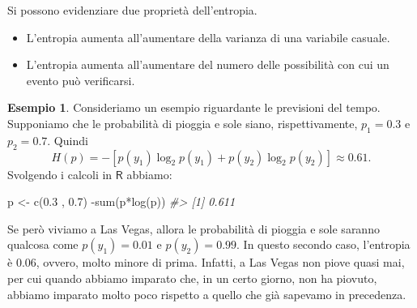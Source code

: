 \documentclass[
  10pt,
  italian,
  a4paper,
  extrafontsizes,onecolumn,openright
  ]{memoir}
\newenvironment{Shaded}{\begin{snugshade}}{\end{snugshade}}
\newcommand{\CommentTok}[1]{\textcolor[rgb]{0.56,0.35,0.01}{\textit{#1}}}
\newcommand{\FloatTok}[1]{\textcolor[rgb]{0.00,0.00,0.81}{#1}}
\newcommand{\FunctionTok}[1]{\textcolor[rgb]{0.00,0.00,0.00}{#1}}
\newcommand{\NormalTok}[1]{#1}
\newcommand{\OtherTok}[1]{\textcolor[rgb]{0.56,0.35,0.01}{#1}}
\newcommand{\SpecialCharTok}[1]{\textcolor[rgb]{0.00,0.00,0.00}{#1}}
\providecommand{\tightlist}{%
  \setlength{\itemsep}{0pt}\setlength{\parskip}{0pt}}
\newcommand{\R}{\textsf{R}} %
\theoremstyle{definition}
\theoremstyle{definition}
\newtheorem{example}{Esempio}[chapter]
\theoremstyle{definition}
\theoremstyle{definition}
\theoremstyle{remark}
\begin{document}
Si possono evidenziare due proprietà dell'entropia.

\begin{itemize}
\tightlist
\item
  L'entropia aumenta all'aumentare della varianza di una variabile casuale.
\item
  L'entropia aumenta all'aumentare del numero delle possibilità con cui un evento può verificarsi.
\end{itemize}

\begin{example}
Consideriamo un esempio riguardante le previsioni del tempo. Supponiamo che le probabilità di pioggia e sole siano, rispettivamente, \(p_1 = 0.3\) e \(p_2 = 0.7\). Quindi
\[
H(p) = − [p(y_1) \log_2 p(y_1) + p(y_2) \log_2 p(y_2)] \approx 0.61.
\]
\noindent
Svolgendo i calcoli in \(\R\) abbiamo:

\begin{Shaded}
\begin{Highlighting}[]
\NormalTok{p }\OtherTok{\textless{}{-}} \FunctionTok{c}\NormalTok{(}\FloatTok{0.3}\NormalTok{ , }\FloatTok{0.7}\NormalTok{)}
\SpecialCharTok{{-}}\FunctionTok{sum}\NormalTok{(p}\SpecialCharTok{*}\FunctionTok{log}\NormalTok{(p))}
\CommentTok{\#\textgreater{} [1] 0.611}
\end{Highlighting}
\end{Shaded}

\noindent
Se però viviamo a Las Vegas, allora le probabilità di pioggia e sole saranno qualcosa come \(p(y_1) = 0.01\) e \(p(y_2) = 0.99\). In questo secondo caso, l'entropia è 0.06, ovvero, molto minore di prima. Infatti, a Las Vegas non piove quasi mai, per cui quando abbiamo imparato che, in un certo giorno, non ha piovuto, abbiamo imparato molto poco rispetto a quello che già sapevamo in precedenza.
\end{example}
\end{document}
